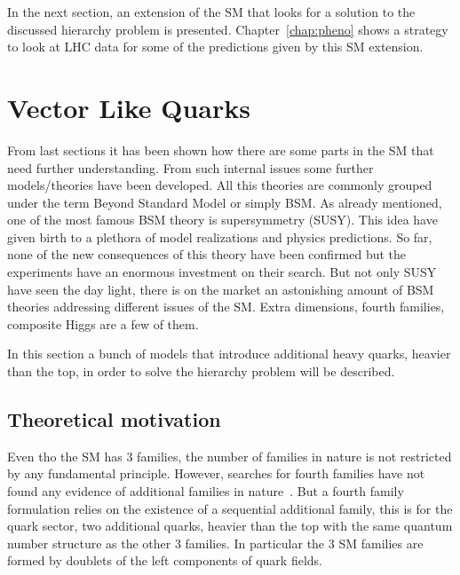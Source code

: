 In the next section, an extension of the SM that looks for a solution to the discussed hierarchy problem is presented. Chapter~\ref{chap:pheno} shows a strategy to look at LHC data for some of the predictions given by this SM extension.  %

\section{Vector Like Quarks}

\label{chap:VLQ}

From last sections it has been shown how there are some parts in the SM that need further understanding. From such internal issues some further models/theories have been developed. All this theories are commonly grouped under the term Beyond Standard Model or simply BSM. As already mentioned, one of the most famous BSM theory is supersymmetry (SUSY). This idea have given birth to a plethora of model realizations and physics predictions. So far, none of the new consequences of this theory have been confirmed but the experiments have an enormous investment on their search. But not only SUSY have seen the day light, there is on the market an astonishing amount of BSM theories addressing different issues of the SM. Extra dimensions, fourth families, composite Higgs are a few of them.

In this section a bunch of models that introduce additional heavy quarks, heavier than the top, in order to solve the hierarchy problem will be described. %

\subsection{Theoretical motivation}
\label{sec:motiv}

Even tho the SM has 3 families, the number of families in nature is not restricted by any fundamental principle. However, searches for fourth families have not found any evidence of additional families in nature~\cite{Eberhardt:2012gv}. But a fourth family formulation relies on the existence of a sequential additional family, this is for the quark sector, two additional quarks, heavier than the top with the same quantum number structure as the other 3 families. In particular the 3 SM families are formed by doublets of the left components of quark fields. 

